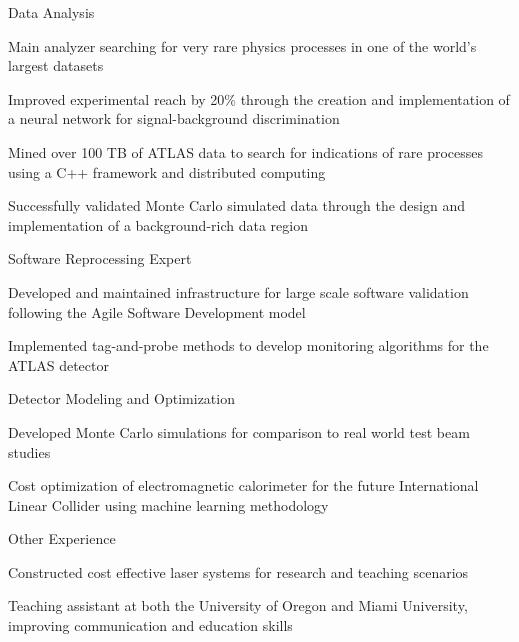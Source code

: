 
\begin{cventries}
  \cventry
    {Data Analysis} %
    {} %
    {} %
    {} %
    {
      \begin{cvitems} %
        \item {Main analyzer searching for very rare physics processes in one of the world's largest datasets}
        \item {Improved experimental reach by 20\% through the creation and implementation of a neural network for signal-background discrimination}
        \item {Mined over 100 TB of ATLAS data to search for indications of rare processes using a C++ framework and distributed computing}
         \item{Successfully validated Monte Carlo simulated data through the design and implementation of a background-rich data region}
      \end{cvitems}
    } 
    \cventry
    {Software Reprocessing Expert} %
    {} %
    {} %
    {} %
    {
      \begin{cvitems} %
        \item {Developed and maintained infrastructure for large scale software validation following the Agile Software Development model }
        \item {Implemented tag-and-probe methods to develop monitoring algorithms for the ATLAS detector}
      \end{cvitems}
    }     
    \cventry
    {Detector Modeling and Optimization}
    {}
    {}
    {}
    {
    \begin{cvitems}
    	\item Developed Monte Carlo simulations for comparison to real world test beam studies
    	\item Cost optimization of electromagnetic calorimeter for the future International Linear Collider using machine learning methodology
    \end{cvitems}
    }
    \cventry
    {Other Experience} %
    {} %
    {} %
    {} %
    {
      \begin{cvitems} %
        \item {Constructed cost effective laser systems for research and teaching scenarios}
        \item {Teaching assistant at both the University of Oregon and Miami University, improving communication and education skills}
      \end{cvitems}
    }    


\end{cventries}

